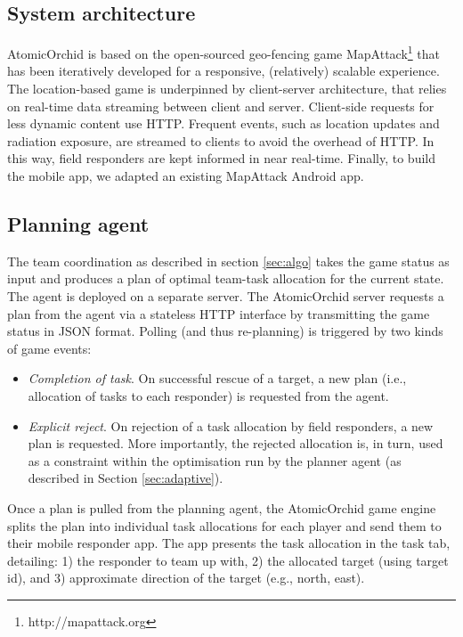 \subsection{System architecture}
\noindent AtomicOrchid is based on the open-sourced geo-fencing game MapAttack\footnote{http://mapattack.org} that has been iteratively developed for a responsive, (relatively) scalable experience.  The location-based game is underpinned by client-server architecture, that relies on real-time data streaming between client and server. Client-side requests for less dynamic content use HTTP. Frequent events, such as location updates and radiation exposure, are streamed to clients to avoid the overhead of HTTP. In this way, field responders are kept informed in near real-time. Finally,  to build the mobile app, we adapted an existing MapAttack Android app.


\subsection{Planning agent}
\noindent The team coordination as described in section \ref{sec:algo} takes the game status as input and produces a plan of optimal team-task allocation for the current state. The agent is deployed on a separate server. The AtomicOrchid server requests a plan from the agent via a stateless HTTP interface by transmitting the game status in JSON format. Polling (and thus re-planning) is triggered by two kinds of game events:
\begin{itemize}
\item \textit{Completion of task}. On successful rescue of a target, a new plan (i.e., allocation of tasks to each responder) is requested from the agent.
\item \textit{Explicit reject}. On rejection of a task allocation by field responders, a new plan is requested. More importantly, the rejected allocation is, in turn, used as a constraint within the optimisation run by the planner agent (as described in Section \ref{sec:adaptive}).
\end{itemize} 

Once a plan is pulled from the planning agent, the AtomicOrchid game engine splits the plan into individual task allocations for each player and send them to their mobile responder app. The app presents the task allocation in the task tab, detailing: 1) the responder to team up with, 2) the allocated target (using target id), and 3) approximate direction of the target (e.g., north, east). 

